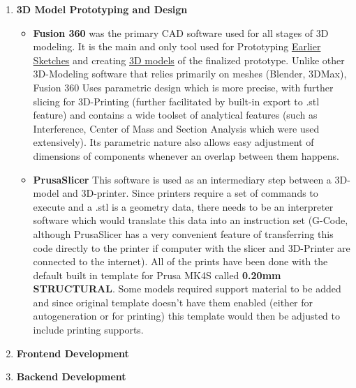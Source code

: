 \begin{enumerate}
\begin{itemize}
	\end{itemize}
	\item\textbf{3D Model Prototyping and Design}
	\begin{itemize}
		\item\textbf{Fusion 360} was the primary \ac{CAD} software used for all stages of 3D modeling. It is the main and only tool used for Prototyping  \hyperref[sec:Bodydesign]{Earlier Sketches} and creating \hyperref[sec:3DPrint]{3D models} of the finalized prototype. Unlike other 3D-Modeling software that relies primarily on meshes (Blender, 3DMax), Fusion 360 Uses parametric design which is more precise, with further slicing for 3D-Printing (further facilitated by built-in export to .stl feature) and contains a wide toolset of analytical features (such as Interference, Center of Mass and Section Analysis which were used extensively). Its parametric nature also allows easy adjustment of dimensions of components whenever an overlap between them happens.
		
		\item\textbf{PrusaSlicer} This software is used as an intermediary step between a 3D-model and 3D-printer. Since printers require a set of commands to execute and a .stl is a geometry data, there needs to be an interpreter software which would translate this data into an instruction set (G-Code, although PrusaSlicer has a very convenient feature of transferring this code directly to the printer if computer with the slicer and 3D-Printer are connected to the internet). All of the prints have been done with the default built in template for Prusa MK4S called \textbf{0.20mm STRUCTURAL}. Some models required support material to be added and since original template doesn't have them enabled (either for autogeneration or for printing) this template would then be adjusted to include printing supports.
	\end{itemize}
	\item\textbf{Frontend Development}
	\item\textbf{Backend Development}
\end{enumerate}